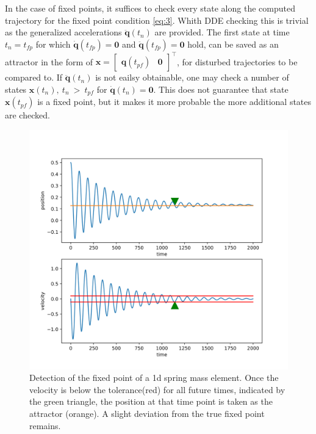 In the case of fixed points, it suffices to check every state along the computed trajectory for the fixed point condition \ref{eq:3}. Whith DDE checking this is trivial as the generalized accelerations $\ddot{\mathbf{q}}(t_n)$ are provided. 
The first state at time $t_n = t_{fp}$ for which $\dot{\mathbf{q}}(t_{fp}) = \mathbf{0}$ and $\ddot{\mathbf{q}}(t_{fp}) = \mathbf{0}$ hold, can be saved as an attractor in the form of $\mathbf{x} = \begin{bmatrix}\mathbf{q}(t_{pf})&\mathbf{0}\end{bmatrix}^\intercal$, for disturbed trajectories to be compared to. 
If $\ddot{\mathbf{q}}(t_n)$ is not eailsy obtainable, one may check a number of states $\mathbf{x}(t_n),\ t_n\ >\ t_{pf}$ for $\dot{\mathbf{q}}(t_n) = \mathbf{0}$. This does not guarantee that state $\mathbf{x}(t_{pf})$ is a fixed point, 
but it makes it more probable the more additional states are checked. 

\begin{figure}[h]
\centering
\includegraphics[width=.7\textwidth]{figures/fixed_point_detection.png}
\caption[Fixed Point Detection]{Detection of the fixed point of a 1d spring mass element. Once the velocity is below the tolerance(red) for all future times, indicated by the green triangle, the position at that time point is taken as the attractor (orange). A slight deviation from the true fixed point remains.}
\label{fpdet}
\end{figure}

